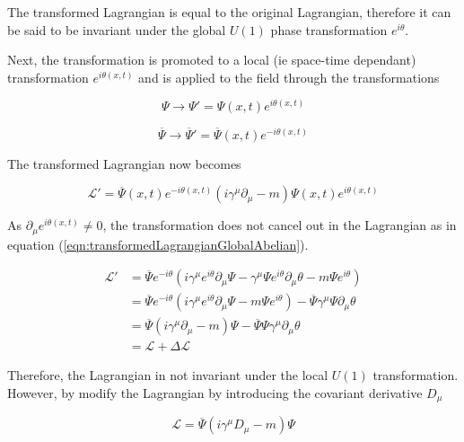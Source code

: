 \documentclass{article}
\begin{document}
The transformed Lagrangian is equal to the original Lagrangian, therefore it can be said to be invariant under the global $U(1)$ phase transformation $e^{i\theta}$.

Next, the transformation is promoted to a local (ie space-time dependant) transformation $e^{i\theta(x,t)}$ and is applied to the field through the transformations

\begin{equation}
\label{eqn:abelianLocalTransformation}
\Psi\rightarrow\Psi'=\Psi(x,t)e^{i\theta(x,t)}
\end{equation}

\begin{equation}
\overline{\Psi}\rightarrow\overline{\Psi}'=\overline{\Psi}(x,t)e^{-i\theta(x,t)}
\end{equation}

The transformed Lagrangian now becomes

\begin{equation}
\mathcal{L'} = \overline{\Psi}(x,t)e^{-i\theta(x,t)}(i\gamma^\mu \partial_\mu - m)\Psi(x,t)e^{i\theta(x,t)}
\end{equation}

As $\partial_\mu e^{i\theta(x,t)}\neq 0$, the transformation does not cancel out in the Lagrangian as in equation (\ref{eqn:transformedLagrangianGlobalAbelian}).

\begin{equation}
\begin{split}
\mathcal{L'} &= \overline{\Psi}e^{-i\theta}(i \gamma^\mu e^{i\theta} \partial_\mu \Psi -\gamma^\mu \Psi e^{i\theta} \partial_\mu \theta - m\Psi e^{i\theta}) \\
&= \overline{\Psi}e^{-i\theta}(i \gamma^\mu e^{i\theta} \partial_\mu \Psi - m\Psi e^{i\theta}) - \overline{\Psi}\gamma^\mu \Psi \partial_\mu \theta \\
&=\overline{\Psi}(i\gamma^\mu \partial_\mu - m)\Psi - \overline{\Psi}\Psi\gamma^\mu \partial_\mu \theta \\
&= \mathcal{L} + \Delta \mathcal{L}
\end{split}
\end{equation}

Therefore, the Lagrangian in not invariant under the local $U(1)$ transformation. However, by modify the Lagrangian by introducing the covariant derivative $D_\mu$

\begin{equation}
\mathcal{L} = \overline{\Psi}(i\gamma^\mu D_\mu -m)\Psi
\end{equation}
\end{document}
